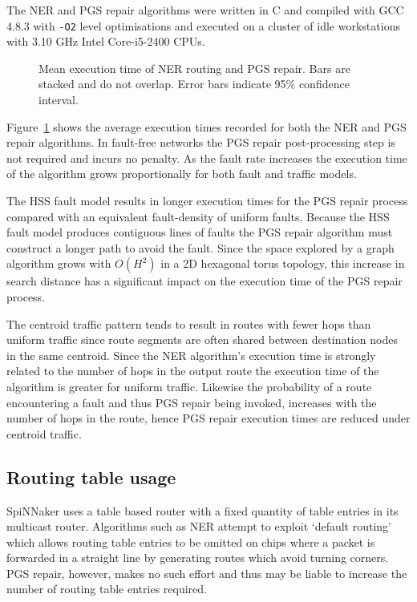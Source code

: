 			The NER and PGS repair algorithms were written in C and compiled with GCC
			4.8.3 with \verb|-O2| level optimisations and executed on a cluster of
			idle workstations with 3.10 GHz Intel Core-i5-2400 CPUs.
			
			\begin{figure}
				\center
				
				\caption[Mean execution time of NER routing and PGS repair.]%
				{Mean execution time of NER routing and PGS repair. Bars are stacked
				and do not overlap. Error bars indicate 95\% confidence interval.}
				\label{fig:routing-runtimes}
			\end{figure}
			
			Figure~\ref{fig:routing-runtimes} shows the average execution times
			recorded for both the NER and PGS repair algorithms. In fault-free
			networks the PGS repair post-processing step is not required and incurs
			no penalty. As the fault rate increases the execution time of the
			algorithm grows proportionally for both fault and traffic models.
			
			The HSS fault model results in longer execution times for the PGS repair
			process compared with an equivalent fault-density of uniform faults.
			Because the HSS fault model produces contiguous lines of faults the PGS
			repair algorithm must construct a longer path to avoid the fault.  Since
			the space explored by a graph algorithm grows with $O(H^2)$ in a 2D
			hexagonal torus topology, this increase in search distance has a
			significant impact on the execution time of the PGS repair process.
			
			The centroid traffic pattern tends to result in routes with fewer hops
			than uniform traffic since route segments are often shared between
			destination nodes in the same centroid.  Since the NER algorithm's
			execution time is strongly related to the number of hops in the output
			route the execution time of the algorithm is greater for uniform traffic.
			Likewise the probability of a route encountering a fault and thus PGS
			repair being invoked, increases with the number of hops in the route,
			hence PGS repair execution times are reduced under centroid traffic.
		
		\subsection{Routing table usage}
			
			SpiNNaker uses a table based router with a fixed quantity of table
			entries in its multicast router. Algorithms such as NER attempt to
			exploit `default routing' which allows routing table entries to be
			omitted on chips where a packet is forwarded in a straight line by
			generating routes which avoid turning corners.  PGS repair, however,
			makes no such effort and thus may be liable to increase the number of
			routing table entries required.
			
